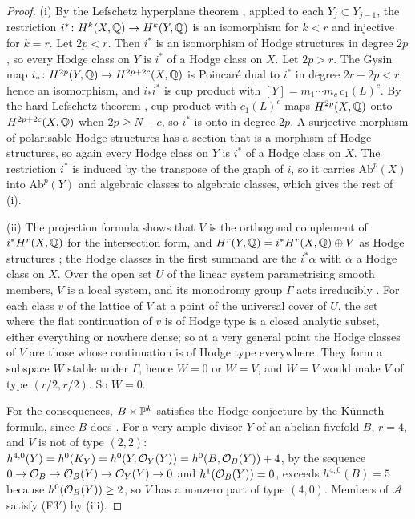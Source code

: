 \begin{proof}
(i) By the Lefschetz hyperplane theorem \cite[Chapter~1]{Voi03}, applied
to each $Y_{j}\subset Y_{j-1}$, the restriction $i^{*}\colon H^{k}(X,\mathbb{Q})\to
H^{k}(Y,\mathbb{Q})$ is an isomorphism for $k<r$ and injective for $k=r$. Let
$2p<r$. Then $i^{*}$ is an isomorphism of Hodge structures in degree $2p$,
so every Hodge class on $Y$ is $i^{*}$ of a Hodge class on $X$. Let $2p>r$.
The Gysin map $i_{*}\colon H^{2p}(Y,\mathbb{Q})\to H^{2p+2c}(X,\mathbb{Q})$ is Poincar\'e
dual to $i^{*}$ in degree $2r-2p<r$, hence an isomorphism, and
$i_{*}i^{*}$ is cup product with $[Y]=m_{1}\cdots m_{c}\,c_{1}(L)^{c}$. By the
hard Lefschetz theorem \cite[Chapter~6]{Voi02}, cup product with
$c_{1}(L)^{c}$ maps $H^{2p}(X,\mathbb{Q})$ onto $H^{2p+2c}(X,\mathbb{Q})$ when $2p\ge N-c$,
so $i^{*}$ is onto in degree $2p$. A surjective morphism of polarisable
Hodge structures has a section that is a morphism of Hodge structures, so
again every Hodge class on $Y$ is $i^{*}$ of a Hodge class on $X$. The
restriction $i^{*}$ is induced by the transpose of the graph of $i$, so it
carries $\mathrm{Ab}^{p}(X)$ into $\mathrm{Ab}^{p}(Y)$ and algebraic classes
to algebraic classes, which gives the rest of (i).

(ii) The projection formula shows that $V$ is the orthogonal complement of
$i^{*}H^{r}(X,\mathbb{Q})$ for the intersection form, and
$H^{r}(Y,\mathbb{Q})=i^{*}H^{r}(X,\mathbb{Q})\oplus V$ as Hodge structures
\cite[Chapter~2]{Voi03}; the Hodge classes in the first summand are the
$i^{*}\alpha$ with $\alpha$ a Hodge class on $X$. Over the open set $U$ of
the linear system parametrising smooth members, $V$ is a local system, and
its monodromy group $\Gamma$ acts irreducibly \cite[Chapter~3]{Voi03}. For
each class $v$ of the lattice of $V$ at a point of the universal cover of
$U$, the set where the flat continuation of $v$ is of Hodge type is a closed
analytic subset, either everything or nowhere dense; so at a very general
point the Hodge classes of $V$ are those whose continuation is of Hodge type
everywhere. They form a subspace $W$ stable under $\Gamma$, hence $W=0$ or
$W=V$, and $W=V$ would make $V$ of type $(r/2,r/2)$. So $W=0$.

For the consequences, $B\times\mathbb{P}^{k}$ satisfies the Hodge conjecture by the
K\"unneth formula, since $B$ does \cite{Mar25a,Mar25b,MZ99}. For a very ample
divisor $Y$ of an abelian fivefold $B$, $r=4$, and $V$ is not of type $(2,2)$:
$h^{4,0}(Y)=h^{0}(K_{Y})=h^{0}(Y,\mathcal{O}_{Y}(Y))=h^{0}(B,\mathcal{O}_{B}(Y))+4$, by the
sequence $0\to\mathcal{O}_{B}\to\mathcal{O}_{B}(Y)\to\mathcal{O}_{Y}(Y)\to0$ and $h^{1}(\mathcal{O}_{B}(Y))=0$,
exceeds $h^{4,0}(B)=5$ because $h^{0}(\mathcal{O}_{B}(Y))\ge2$, so $V$ has a nonzero
part of type $(4,0)$. Members of $\mathcal{A}$ satisfy \textup{(F3$'$)} by
(iii).
\end{proof}


